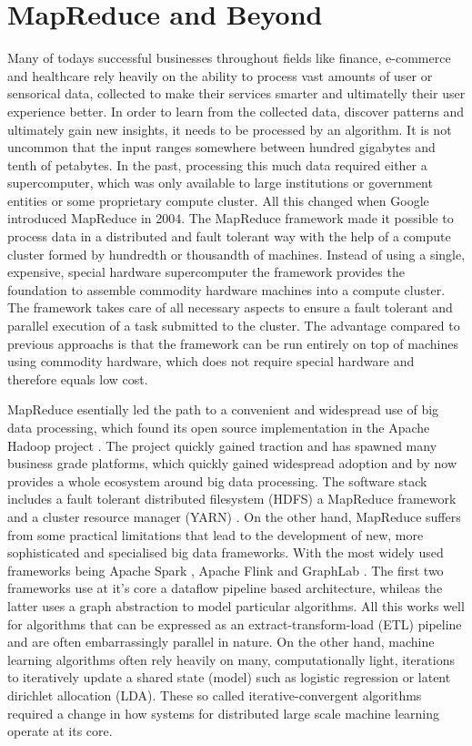 \section{MapReduce and Beyond}
Many of todays successful businesses throughout fields like finance, e-commerce and healthcare rely heavily on the ability to process vast amounts of user or sensorical data, collected to make their services smarter and ultimatelly their user experience better.
In order to learn from the collected data, discover patterns and ultimately gain new insights, it needs to be processed by an algorithm.
It is not uncommon that the input ranges somewhere between hundred gigabytes and tenth of petabytes.
In the past, processing this much data required either a supercomputer, which was only available to large institutions or government entities or some proprietary compute cluster.
All this changed when Google introduced MapReduce \cite{Dean2004} in 2004.
The MapReduce framework made it possible to process data in a distributed and fault tolerant way with the help of a compute cluster formed by hundredth or thousandth of machines.
Instead of using a single, expensive, special hardware supercomputer the framework provides the foundation to assemble commodity hardware machines into a compute cluster.
The framework takes care of all necessary aspects to ensure a fault tolerant and parallel execution of a task submitted to the cluster.
The advantage compared to previous approachs is that the framework can be run entirely on top of machines using commodity hardware, which does not require special hardware and therefore equals low cost.

MapReduce esentially led the path to a convenient and widespread use of big data processing, which found its open source implementation in the Apache Hadoop project \cite{hadoop2009hadoop}.
The project quickly gained traction and has spawned many business grade platforms, which quickly gained widespread adoption and by now provides a whole ecosystem around big data processing. The software stack includes a fault tolerant distributed filesystem (HDFS) a MapReduce framework and a cluster resource manager (YARN) \cite{KumarVavilapalli2013}.
On the other hand, MapReduce suffers from some practical limitations that lead to the development of new, more sophisticated and specialised big data frameworks. With the most widely used frameworks being Apache Spark \cite{Zaharia2010}, Apache Flink \cite{Alexandrov2014} and GraphLab \cite{Low2012}.
The first two frameworks use at it's core a dataflow pipeline based architecture, whileas the latter uses a graph abstraction to model particular algorithms.
All this works well for algorithms that can be expressed as an extract-transform-load (ETL) pipeline and are often embarrassingly parallel in nature.
On the other hand, machine learning algorithms often rely heavily on many, computationally light, iterations to iteratively update a shared state (model) such as logistic regression or latent dirichlet allocation (LDA).
These so called iterative-convergent algorithms required a change in how systems for distributed large scale machine learning operate at its core.


